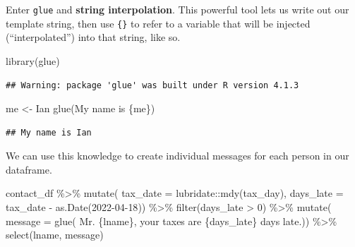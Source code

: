\documentclass[
]{book}
\newenvironment{Shaded}{\begin{snugshade}}{\end{snugshade}}
\newcommand{\AttributeTok}[1]{\textcolor[rgb]{0.77,0.63,0.00}{#1}}
\newcommand{\DecValTok}[1]{\textcolor[rgb]{0.00,0.00,0.81}{#1}}
\newcommand{\FunctionTok}[1]{\textcolor[rgb]{0.00,0.00,0.00}{#1}}
\newcommand{\NormalTok}[1]{#1}
\newcommand{\OtherTok}[1]{\textcolor[rgb]{0.56,0.35,0.01}{#1}}
\newcommand{\SpecialCharTok}[1]{\textcolor[rgb]{0.00,0.00,0.00}{#1}}
\newcommand{\StringTok}[1]{\textcolor[rgb]{0.31,0.60,0.02}{#1}}
\begin{document}
Enter \texttt{glue} and \textbf{string interpolation}. This powerful tool lets us write out our template string, then use \texttt{\{\}} to refer to a variable that will be injected (``interpolated'') into that string, like so.

\begin{Shaded}
\begin{Highlighting}[]
\FunctionTok{library}\NormalTok{(glue)}
\end{Highlighting}
\end{Shaded}

\begin{verbatim}
## Warning: package 'glue' was built under R version 4.1.3
\end{verbatim}

\begin{Shaded}
\begin{Highlighting}[]
\NormalTok{me }\OtherTok{\textless{}{-}} \StringTok{\textquotesingle{}Ian\textquotesingle{}}
\FunctionTok{glue}\NormalTok{(}\StringTok{\textquotesingle{}My name is \{me\}\textquotesingle{}}\NormalTok{)}
\end{Highlighting}
\end{Shaded}

\begin{verbatim}
## My name is Ian
\end{verbatim}

We can use this knowledge to create individual messages for each person in our dataframe.

\begin{Shaded}
\begin{Highlighting}[]
\NormalTok{contact\_df }\SpecialCharTok{\%\textgreater{}\%} 
  \FunctionTok{mutate}\NormalTok{(}
    \AttributeTok{tax\_date =}\NormalTok{ lubridate}\SpecialCharTok{::}\FunctionTok{mdy}\NormalTok{(tax\_day),}
    \AttributeTok{days\_late =}\NormalTok{ tax\_date }\SpecialCharTok{{-}} \FunctionTok{as.Date}\NormalTok{(}\StringTok{\textquotesingle{}2022{-}04{-}18\textquotesingle{}}\NormalTok{)) }\SpecialCharTok{\%\textgreater{}\%} 
  \FunctionTok{filter}\NormalTok{(days\_late }\SpecialCharTok{\textgreater{}} \DecValTok{0}\NormalTok{) }\SpecialCharTok{\%\textgreater{}\%} 
  \FunctionTok{mutate}\NormalTok{(}
    \AttributeTok{message =} \FunctionTok{glue}\NormalTok{(}
      \StringTok{\textquotesingle{}Mr. \{lname\}, your taxes are \{days\_late\} days late.\textquotesingle{}}\NormalTok{)) }\SpecialCharTok{\%\textgreater{}\%} 
  \FunctionTok{select}\NormalTok{(lname, message)}
\end{Highlighting}
\end{Shaded}
\end{document}

